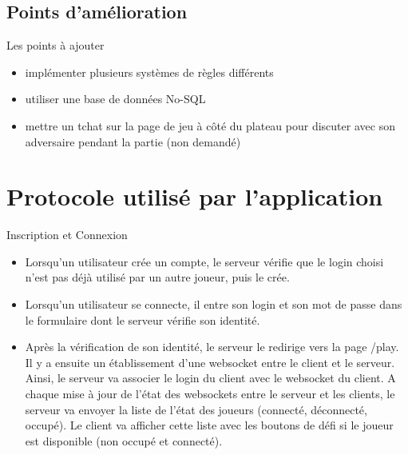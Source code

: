 \documentclass{beamer}
\begin{document}
\subsection{Points d'amélioration}

\begin{frame}
\begin{block}{Les points à ajouter} 
\begin{itemize}
[circle]
\item implémenter plusieurs systèmes de règles différents
\item utiliser une base de données No-SQL
\item mettre un tchat sur la page de jeu à côté du plateau pour discuter avec son adversaire pendant la partie (non demandé)
\end{itemize}
\end{block}
\end{frame}

\section{Protocole utilisé par l'application}
\begin{frame}
\begin{exampleblock}{Inscription et Connexion} 
	\begin{itemize}
		[circle]
		\item Lorsqu'un utilisateur crée un compte, le serveur vérifie que le login choisi n'est pas déjà utilisé par un autre joueur, puis le crée.
		\item Lorsqu'un utilisateur se connecte, il entre son login et son mot de passe dans le formulaire dont le serveur vérifie son identité.
		\item Après la vérification de son identité, le serveur le redirige vers la page /play. Il y a ensuite un établissement d'une websocket entre le client et le serveur. Ainsi, le serveur va associer le login du client avec le websocket du client. A chaque mise à jour de l'état des websockets entre le serveur et les clients, le serveur va envoyer la liste de l'état des joueurs (connecté, déconnecté, occupé). Le client va afficher cette liste avec les boutons de défi si le joueur est disponible (non occupé et connecté).
	\end{itemize}
\end{exampleblock}
\end{frame}
\end{document}
